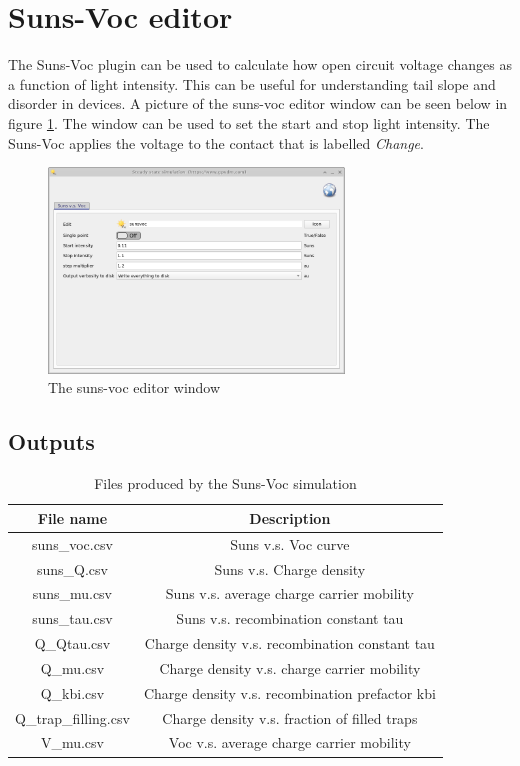 \clearpage
\section{Suns-Voc editor}
The Suns-Voc plugin can be used to calculate how open circuit voltage changes as a function of light intensity.  This can be useful for understanding tail slope and disorder in devices.  A picture of the suns-voc editor window can be seen below in figure \ref{fig:sunsvoceditor}.  The window can be used to set the start and stop light intensity. The Suns-Voc applies the voltage to the contact that is labelled \emph{Change}.

\begin{figure}[H]
\centering
\includegraphics[width=0.7\textwidth,height=0.5\textwidth]{./images/sim_editors/suns_voc_editor.png}
\caption{The suns-voc editor window}
\label{fig:sunsvoceditor}
\end{figure}


\subsection{Outputs}

\begin{table}[H]
\begin{center}
\begin{tabular}{ |c|c| } 
 \hline
	File name 			& 	Description  \\ 
 \hline
	suns\_voc.csv 		&	Suns v.s. Voc curve \\ 
	suns\_Q.csv 		&	Suns v.s. Charge density\\ 
	suns\_mu.csv 		&	Suns v.s. average charge carrier mobility\\
	suns\_tau.csv 		&	Suns v.s. recombination constant tau \\ 
	Q\_Qtau.csv 		&	Charge density v.s. recombination constant tau \\
	Q\_mu.csv 			&	Charge density v.s. charge carrier mobility\\
	Q\_kbi.csv 			&	Charge density v.s. recombination prefactor kbi\\
	Q\_trap\_filling.csv &	Charge density v.s. fraction of filled traps\\
	V\_mu.csv 			&	Voc v.s. average charge carrier mobility\\
 \hline
\end{tabular}
\caption{Files produced by the Suns-Voc simulation}
\label{tab:suns_voc_output}
\end{center}
\end{table}

